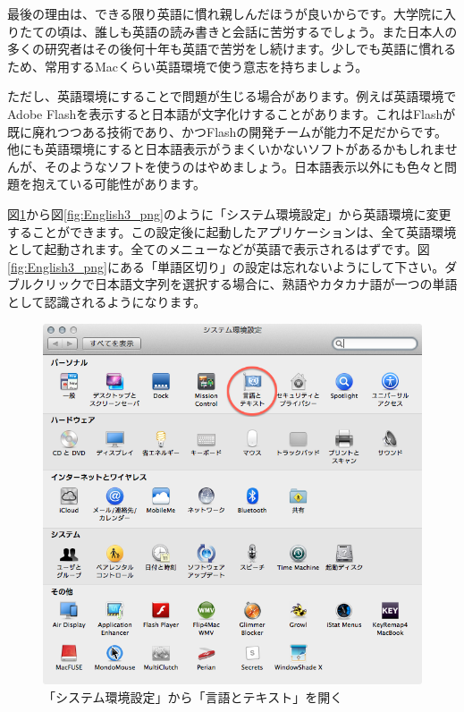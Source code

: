 最後の理由は、できる限り英語に慣れ親しんだほうが良いからです。大学院に入りたての頃は、誰しも英語の読み書きと会話に苦労するでしょう。また日本人の多くの研究者はその後何十年も英語で苦労をし続けます。少しでも英語に慣れるため、常用するMacくらい英語環境で使う意志を持ちましょう。

ただし、英語環境にすることで問題が生じる場合があります。例えば英語環境でAdobe Flashを表示すると日本語が文字化けすることがあります。これはFlashが既に廃れつつある技術であり、かつFlashの開発チームが能力不足だからです。他にも英語環境にすると日本語表示がうまくいかないソフトがあるかもしれませんが、そのようなソフトを使うのはやめましょう。日本語表示以外にも色々と問題を抱えている可能性があります。

図\ref{fig:English1_png}から図\ref{fig:English3_png}のように「システム環境設定」から英語環境に変更することができます。この設定後に起動したアプリケーションは、全て英語環境として起動されます。全てのメニューなどが英語で表示されるはずです。図\ref{fig:English3_png}にある「単語区切り」の設定は忘れないようにして下さい。ダブルクリックで日本語文字列を選択する場合に、熟語やカタカナ語が一つの単語として認識されるようになります。

\begin{figure}
  \centering
  \includegraphics[scale=0.35]{fig/English1.png}
  \caption{「システム環境設定」から「言語とテキスト」を開く}
  \label{fig:English1_png}
\end{figure}

